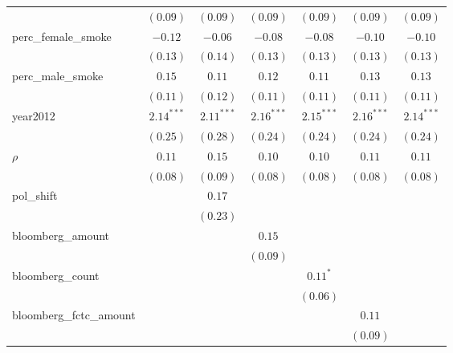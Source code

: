 \begin{table}[!h]
\begin{center}
\begin{tabular}{l c c c c c c }
                        & $(0.09)$     & $(0.09)$     & $(0.09)$     & $(0.09)$     & $(0.09)$     & $(0.09)$     \\
perc\_female\_smoke     & $-0.12$      & $-0.06$      & $-0.08$      & $-0.08$      & $-0.10$      & $-0.10$      \\
                        & $(0.13)$     & $(0.14)$     & $(0.13)$     & $(0.13)$     & $(0.13)$     & $(0.13)$     \\
perc\_male\_smoke       & $0.15$       & $0.11$       & $0.12$       & $0.11$       & $0.13$       & $0.13$       \\
                        & $(0.11)$     & $(0.12)$     & $(0.11)$     & $(0.11)$     & $(0.11)$     & $(0.11)$     \\
year2012                & $2.14^{***}$ & $2.11^{***}$ & $2.16^{***}$ & $2.15^{***}$ & $2.16^{***}$ & $2.14^{***}$ \\
                        & $(0.25)$     & $(0.28)$     & $(0.24)$     & $(0.24)$     & $(0.24)$     & $(0.24)$     \\
$\rho$                  & $0.11$       & $0.15$       & $0.10$       & $0.10$       & $0.11$       & $0.11$       \\
                        & $(0.08)$     & $(0.09)$     & $(0.08)$     & $(0.08)$     & $(0.08)$     & $(0.08)$     \\
pol\_shift              &              & $0.17$       &              &              &              &              \\
                        &              & $(0.23)$     &              &              &              &              \\
bloomberg\_amount       &              &              & $0.15$       &              &              &              \\
                        &              &              & $(0.09)$     &              &              &              \\
bloomberg\_count        &              &              &              & $0.11^{*}$   &              &              \\
                        &              &              &              & $(0.06)$     &              &              \\
bloomberg\_fctc\_amount &              &              &              &              & $0.11$       &              \\
                        &              &              &              &              & $(0.09)$     &              \\

\end{tabular}
\end{center}
\end{table}

